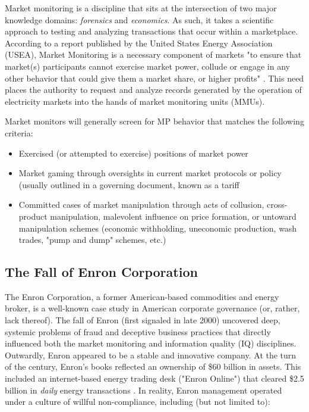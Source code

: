 Market monitoring is a discipline that sits at the intersection of two major knowledge domains: \textit{forensics} and \textit{economics}. As such, it takes a scientific approach to testing and analyzing transactions that occur within a marketplace. According to a report published by the United States Energy Association (USEA), Market Monitoring is a necessary component of markets "to ensure that market(s) participants cannot exercise market power, collude or engage in any other behavior that could give them a market share, or higher profits" \cite{imm-usea}. This need places the authority to request and analyze records generated by the operation of electricity markets into the hands of market monitoring units (MMUs).

Market monitors will generally screen for MP behavior that matches the following criteria:

\begin{itemize}
    \item{Exercised (or attempted to exercise) positions of market power}
    \item{Market gaming through oversights in current market protocols or policy (usually outlined in a governing document, known as a tariff}
    \item{Committed cases of market manipulation through acts of collusion, cross-product manipulation, malevolent influence on price formation, or untoward manipulation schemes (economic withholding, uneconomic production, wash trades, "pump and dump" schemes, etc.)}
\end{itemize}


\subsection{The Fall of Enron Corporation}

The Enron Corporation, a former American-based commodities and energy broker, is a well-known case study in American corporate governance (or, rather, lack thereof). The fall of Enron (first signaled in late 2000) uncovered deep, systemic problems of fraud and deceptive business practices that directly influenced both the market monitoring and information quality (IQ) disciplines. Outwardly, Enron appeared to be a stable and innovative company. At the turn of the century, Enron's books reflected an ownership of \$60 billion in assets. This included an internet-based energy trading desk ("Enron Online") that cleared \$2.5 billion in \textit{daily} energy transactions \cite{enron-financials}. In reality, Enron management operated under a culture of willful non-compliance, including (but not limited to):

